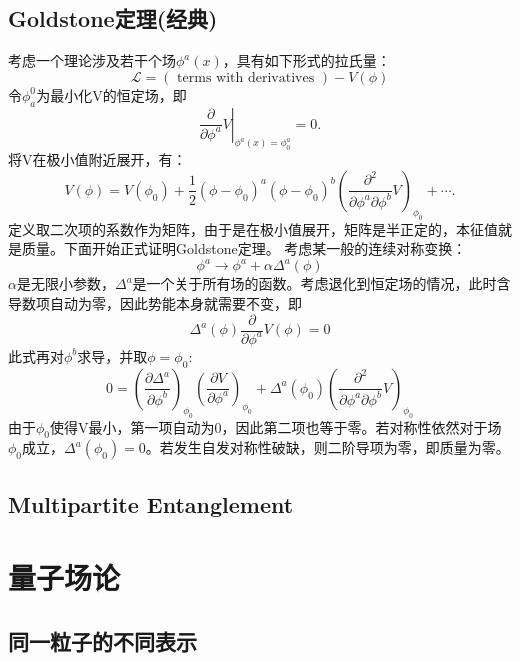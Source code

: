 \documentclass[10pt,openany]{book}
\theoremstyle{thmstyle} %
\theoremstyle{defstyle} %
\theoremstyle{prostyle} %
\begin{document}
\section{Goldstone定理(经典)}
考虑一个理论涉及若干个场$ \phi^a(x) $，具有如下形式的拉氏量：
\begin{equation}
  \mathcal{L}=(\text { terms with derivatives })-V(\phi)
\end{equation}
令$ \phi^0_a $为最小化V的恒定场，即
\begin{equation*}
  \left.\frac{\partial}{\partial \phi^a} V\right|_{\phi^a(x)=\phi_0^a}=0 .
\end{equation*} 
将V在极小值附近展开，有：
\begin{equation*}
  V(\phi)=V\left(\phi_0\right)+\frac{1}{2}\left(\phi-\phi_0\right)^a\left(\phi-\phi_0\right)^b\left(\frac{\partial^2}{\partial \phi^a \partial \phi^b} V\right)_{\phi_0}+\cdots .
\end{equation*}
定义取二次项的系数作为矩阵，由于是在极小值展开，矩阵是半正定的，本征值就是质量。下面开始正式证明Goldstone定理。
考虑某一般的连续对称变换：
\begin{equation}
  \phi^a \longrightarrow \phi^a+\alpha \Delta^a(\phi)
\end{equation}
$ \alpha $是无限小参数，$ \Delta^a $是一个关于所有场的函数。考虑退化到恒定场的情况，此时含导数项自动为零，因此势能本身就需要不变，即
\begin{equation*}
  \Delta^a(\phi) \frac{\partial}{\partial \phi^a} V(\phi)=0
\end{equation*} 
此式再对$ \phi^b $求导，并取$ \phi=\phi_0 $:
\begin{equation*}
  0=\left(\frac{\partial \Delta^a}{\partial \phi^b}\right)_{\phi_0}\left(\frac{\partial V}{\partial \phi^a}\right)_{\phi_0}+\Delta^a\left(\phi_0\right)\left(\frac{\partial^2}{\partial \phi^a \partial \phi^b} V\right)_{\phi_0}
\end{equation*}   
由于$ \phi_0 $使得V最小，第一项自动为0，因此第二项也等于零。若对称性依然对于场$ \phi_0 $成立，$ \Delta^a(\phi_0)=0 $。若发生自发对称性破缺，则二阶导项为零，即质量为零。   

\section{Multipartite Entanglement}
\chapter{量子场论}
  \section{同一粒子的不同表示}
\end{document}
